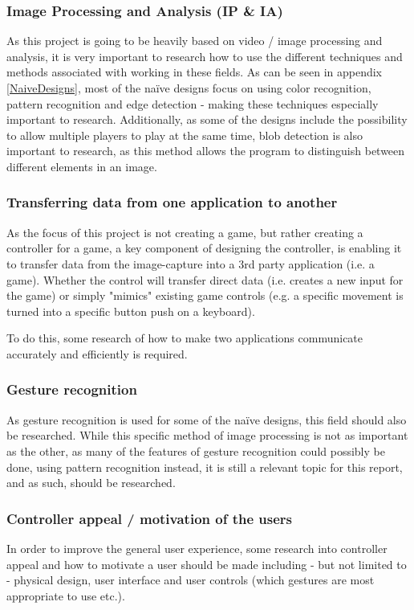 \subsubsection{Image Processing and Analysis (IP \& IA)}
As this project is going to be heavily based on video / image processing and analysis, it is very important to research how to use the different techniques and methods associated with working in these fields. As can be seen in appendix \ref{NaiveDesigns}, most of the naïve designs focus on using color recognition, pattern recognition and edge detection - making these techniques especially important to research. Additionally, as some of the designs include the possibility to allow multiple players to play at the same time, blob detection is also important to research, as this method allows the program to distinguish between different elements in an image.

\subsubsection{Transferring data from one application to another}
As the focus of this project is not creating a game, but rather creating a controller for a game, a key component of designing the controller, is enabling it to transfer data from the image-capture into a 3rd party application (i.e. a game). Whether the control will transfer direct data (i.e. creates a new input for the game) or simply "mimics" existing game controls (e.g. a specific movement is turned into a specific button push on a keyboard).

To do this, some research of how to make two applications communicate accurately and efficiently is required.

\subsubsection{Gesture recognition}
As gesture recognition is used for some of the naïve designs, this field should also be researched. While this specific method of image processing is not as important as the other, as many of the features of gesture recognition could possibly be done, using pattern recognition instead, it is still a relevant topic for this report, and as such, should be researched.

\subsubsection{Controller appeal / motivation of the users}
In order to improve the general user experience, some research into controller appeal and how to motivate a user should be made including - but not limited to - physical design, user interface and user controls (which gestures are most appropriate to use etc.).

